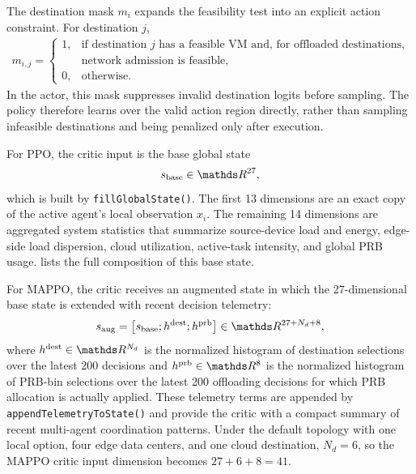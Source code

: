 The destination mask \(m_i\) expands the feasibility test into an explicit action constraint. For destination \(j\),
\begin{align}
m_{i,j} =
\begin{cases}
1, & \text{if destination \(j\) has a feasible VM and, for offloaded destinations,} \\
   & \text{network admission is feasible}, \\
0, & \text{otherwise}.
\end{cases}
\end{align}
In the actor, this mask suppresses invalid destination logits before sampling. The policy therefore learns over the valid action region directly, rather than sampling infeasible destinations and being penalized only after execution.

For PPO, the critic input is the base global state
\begin{align}
s_{\mathrm{base}} \in \R^{27},
\end{align}
which is built by \texttt{fillGlobalState()}. The first 13 dimensions are an exact copy of the active agent's local observation \(x_i\). The remaining 14 dimensions are aggregated system statistics that summarize source-device load and energy, edge-side load dispersion, cloud utilization, active-task intensity, and global PRB usage.  lists the full composition of this base state.

For MAPPO, the critic receives an augmented state in which the 27-dimensional base state is extended with recent decision telemetry:
\begin{align}
s_{\mathrm{aug}} = \left[s_{\mathrm{base}}; h^{\mathrm{dest}}; h^{\mathrm{prb}}\right]
\in \R^{27 + N_d + 8},
\end{align}
where \(h^{\mathrm{dest}} \in \R^{N_d}\) is the normalized histogram of destination selections over the latest 200 decisions and \(h^{\mathrm{prb}} \in \R^{8}\) is the normalized histogram of PRB-bin selections over the latest 200 offloading decisions for which PRB allocation is actually applied. These telemetry terms are appended by \texttt{appendTelemetryToState()} and provide the critic with a compact summary of recent multi-agent coordination patterns. Under the default topology with one local option, four edge data centers, and one cloud destination, \(N_d = 6\), so the MAPPO critic input dimension becomes \(27 + 6 + 8 = 41\).

